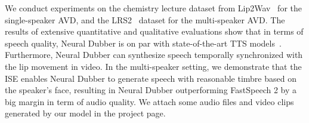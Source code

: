 \documentclass{article}
\newcommand{\hang}[1]{{\color{red}{\scriptsize\textbf{Hang: #1}}}}
\begin{document}
We conduct experiments on the chemistry lecture dataset from Lip2Wav~\cite{prajwal2020learning} for the single-speaker AVD, and the LRS2~\cite{afouras2018deepav} dataset for the multi-speaker AVD. The results of extensive quantitative and qualitative evaluations show that in terms of speech quality, Neural Dubber is on par with state-of-the-art TTS models~\cite{wang2017tacotron, shen2018natural, ren2021fastspeech}. Furthermore, Neural Dubber can synthesize speech temporally synchronized with the lip movement in video. In the multi-speaker setting, we demonstrate that the ISE enables Neural Dubber to generate speech with reasonable timbre based on the speaker's face, resulting in Neural Dubber outperforming FastSpeech 2 by a big margin in term of audio quality. We attach some audio files and video clips generated by our model in the project page.


\end{document}
